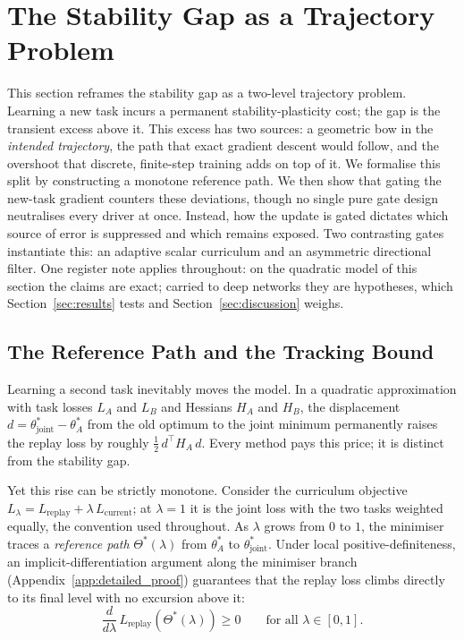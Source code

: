 \section{The Stability Gap as a Trajectory Problem}
\label{sec:motivation}

This section reframes the stability gap as a two-level trajectory problem. Learning a new task incurs a permanent stability-plasticity cost; the gap is the transient excess above it. This excess has two sources: a geometric bow in the \emph{intended trajectory}, the path that exact gradient descent would follow, and the overshoot that discrete, finite-step training adds on top of it. We formalise this split by constructing a monotone reference path. We then show that gating the new-task gradient counters these deviations, though no single pure gate design neutralises every driver at once. Instead, how the update is gated dictates which source of error is suppressed and which remains exposed. Two contrasting gates instantiate this: an adaptive scalar curriculum and an asymmetric directional filter. One register note applies throughout: on the quadratic model of this section the claims are exact; carried to deep networks they are hypotheses, which Section~\ref{sec:results} tests and Section~\ref{sec:discussion} weighs.

\subsection{The Reference Path and the Tracking Bound}
\label{subsec:reference}

Learning a second task inevitably moves the model. In a quadratic approximation with task losses $L_A$ and $L_B$ and Hessians $H_A$ and $H_B$, the displacement $d = \theta_{\text{joint}}^* - \theta_A^*$ from the old optimum to the joint minimum permanently raises the replay loss by roughly $\tfrac{1}{2}\,d^\top H_A\, d$. Every method pays this price; it is distinct from the stability gap.

Yet this rise can be strictly monotone. Consider the curriculum objective $L_\lambda = L_{\text{replay}} + \lambda\, L_{\text{current}}$; at $\lambda = 1$ it is the joint loss with the two tasks weighted equally, the convention used throughout. As $\lambda$ grows from $0$ to $1$, the minimiser traces a \emph{reference path} $\Theta^*(\lambda)$ from $\theta_A^*$ to $\theta_{\text{joint}}^*$. Under local positive-definiteness, an implicit-differentiation argument along the minimiser branch (Appendix~\ref{app:detailed_proof}) guarantees that the replay loss climbs directly to its final level with no excursion above it:
\begin{equation}
    \frac{d}{d\lambda}\, L_{\text{replay}}(\Theta^*(\lambda)) \geq 0 \qquad \text{for all } \lambda \in [0,1].
\end{equation}

